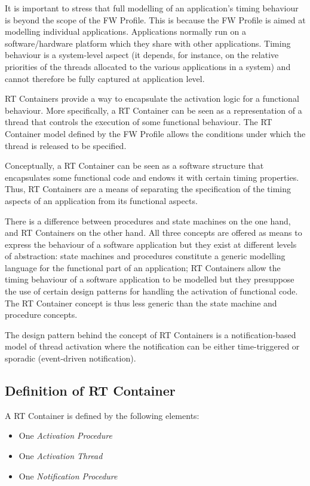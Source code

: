 \documentclass[manual]{../fwprofile}
\begin{document}
It is important to stress that full modelling of an application's timing behaviour is beyond the scope of the FW Profile. This is because the FW Profile is aimed at modelling individual applications. Applications normally run on a software/hardware platform which they share with other applications. Timing behaviour is a system-level aspect (it depends, for instance, on the relative priorities of the threads allocated to the various applications in a system) and cannot therefore be fully captured at application level.

RT Containers provide a way to encapsulate the activation logic for a functional behaviour. More specifically, a RT Container can be seen as a representation of a thread that controls the execution of some functional behaviour. The RT Container model defined by the FW Profile allows the conditions under which the thread is released to be specified.

Conceptually, a RT Container can be seen as a software structure that encapsulates some
functional code and endows it with certain timing properties. Thus, RT Containers are a means of separating the specification of the timing aspects of an application from its functional aspects.

There is a difference between procedures and state machines on the one hand, and RT Containers on the other hand. All three concepts are offered as means to express the behaviour of a software application but they exist at different levels of abstraction: state machines and procedures constitute a generic modelling language for the functional part of an application; RT Containers allow the timing behaviour of a software application to be modelled but they presuppose the use of certain design patterns for handling the activation of functional code. The RT Container concept is thus less generic than the state machine and procedure concepts.

The design pattern behind the concept of RT Containers is a notification-based model of thread activation where the notification can be either time-triggered or sporadic (event-driven notification).

\subsection{Definition of RT Container}
A RT Container is defined by the following elements:

\begin{itemize}[itemsep=0mm]
\item One \emph{Activation Procedure}
\item One \emph{Activation Thread}
\item One \emph{Notification Procedure} 
\end{itemize}
\end{document}
